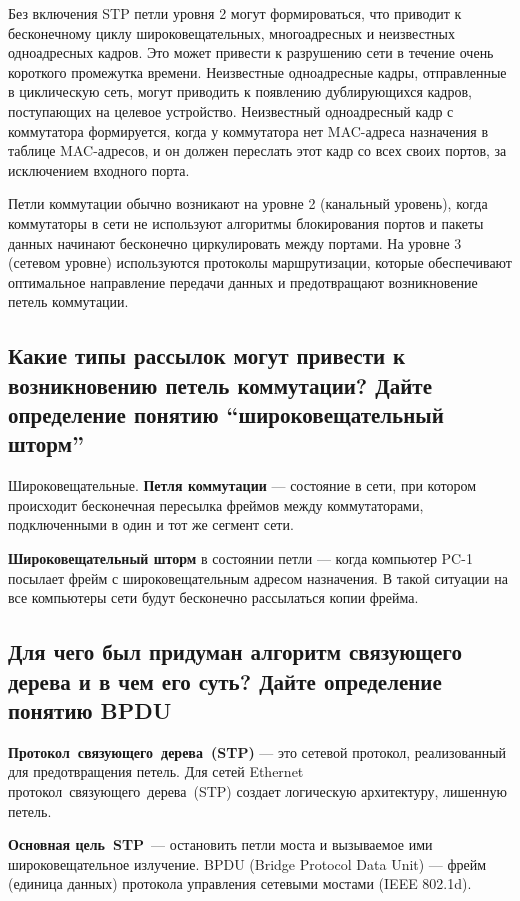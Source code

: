 Без включения STP петли уровня 2 могут формироваться, что приводит 
к бесконечному циклу широковещательных, многоадресных и неизвестных 
одноадресных кадров. Это может привести к разрушению сети в течение 
очень короткого промежутка времени.
Неизвестные одноадресные кадры, отправленные в циклическую сеть, 
могут приводить к появлению дублирующихся кадров, поступающих на 
целевое устройство. Неизвестный одноадресный кадр с коммутатора 
формируется, когда у коммутатора нет MAC-адреса назначения в таблице 
MAC-адресов, и он должен переслать этот кадр со всех своих портов, за 
исключением входного порта.\par
Петли коммутации обычно возникают на уровне 2 (канальный 
уровень), когда коммутаторы в сети не используют алгоритмы блокирования 
портов и пакеты данных начинают бесконечно циркулировать между 
портами. На уровне 3 (сетевом уровне) используются протоколы 
маршрутизации, которые обеспечивают оптимальное направление передачи 
данных и предотвращают возникновение петель коммутации.

\subsection{Какие типы рассылок могут привести
	к возникновению петель коммутации?
	Дайте определение понятию “широковещательный шторм”}

Широковещательные.
\textbf{Петля коммутации} --- состояние в сети,
при котором происходит бесконечная пересылка фреймов между коммутаторами,
подключенными в один и тот же сегмент сети.\par
\textbf{Широковещательный шторм} в состоянии петли ---
когда компьютер PC-1 посылает фрейм с широковещательным адресом назначения.
В такой ситуации на все компьютеры сети будут бесконечно
рассылаться копии фрейма.

\subsection{Для чего был придуман алгоритм связующего дерева и в чем его суть?
	Дайте определение понятию BPDU}

\textbf{Протокол связующего дерева (STP)} --- это сетевой протокол,
реализованный для предотвращения петель.
Для сетей Ethernet протокол связующего дерева (STP)
создает логическую архитектуру, лишенную петель.\par
\textbf{Основная цель STP} --- остановить петли моста
и вызываемое ими широковещательное излучение.
BPDU (Bridge Protocol Data Unit) --- фрейм (единица данных)
протокола управления сетевыми мостами (IEEE 802.1d).


